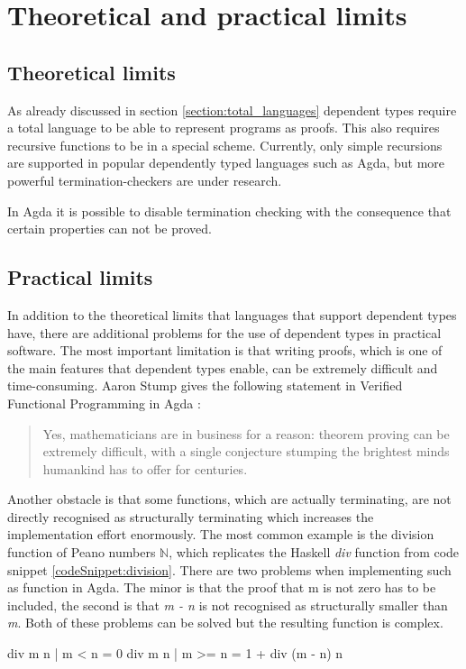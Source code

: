 \section{Theoretical and practical limits}\label{section:limits}
\subsection{Theoretical limits}
As already discussed in section \ref{section:total_languages} dependent types require a total language to be able to represent programs as proofs.
This also requires recursive functions to be in a special scheme.
Currently, only simple recursions are supported in popular dependently typed languages such as Agda, but more powerful termination-checkers are under research.

In Agda it is possible to disable termination checking with the consequence that certain properties can not be proved.
\subsection{Practical limits}
In addition to the theoretical limits that languages that support dependent types have, there are additional problems for the use of dependent types in practical software.
The most important limitation is that writing proofs, which is one of the main features that dependent types enable, can be extremely difficult and time-consuming.
Aaron Stump gives the following statement in Verified Functional Programming in Agda \cite{10.1145/2841316}:
\begin{quote}
Yes, mathematicians are in business for a reason: theorem proving can be extremely difficult, with a single conjecture stumping the brightest minds humankind has to offer for centuries.
\end{quote}

Another obstacle is that some functions, which are actually terminating, are not directly recognised as structurally terminating which increases the implementation effort enormously.
The most common example is the division function of Peano numbers $\mathbb{N}$, which replicates the Haskell \emph{div} function from code snippet \ref{codeSnippet:division}.
There are two problems when implementing such as function in Agda. The minor is that the proof that m is not zero has to be included, the second is that \emph{m - n} is not recognised as structurally smaller than \emph{m}. Both of these problems can be solved but the resulting function is complex.
\begin{codesnippet}[mathescape=true, caption={Definition of div function in Haskell}, label={codeSnippet:division}]
div m n | m < n = 0
div m n | m >= n = 1 + div (m - n) n
\end{codesnippet}

